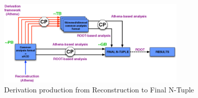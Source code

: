 \begin{figure}[h]
  \centering
  \includegraphics[width=0.8\textwidth]{content/img/catmore-derivation.png}
  \caption{Derivation production from Reconstruction to Final N-Tuple\cite{DAOD_Laycock_2014}}
  \label{fig:IO_derivation_framework}
\end{figure}
